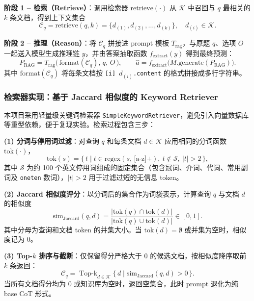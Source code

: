 \documentclass[lang=cn,a4paper,newtx]{elegantpaper}
\begin{document}
\textbf{阶段 1 -- 检索（Retrieve）}：调用检索器 $\mathrm{retrieve}(\cdot)$ 从 $\mathcal{K}$ 中召回与 $q$ 最相关的 $k$ 条文档，得到上下文集合
\begin{equation}
\mathcal{C}_q = \mathrm{retrieve}(q, k) = \{d_{(1)}, d_{(2)}, \ldots, d_{(k)}\},
\quad d_{(i)} \in \mathcal{K}.
\end{equation}

\textbf{阶段 2 -- 推理（Reason）}：将 $\mathcal{C}_q$ 拼接进 prompt 模板 $T_{\text{rag}}$，与原题 $q$、选项 $O$ 一起送入模型生成推理链 $y$，并由答案抽取函数 $f_{\text{extract}}(y)$ 得到最终预测：
\begin{equation}
P_{\text{RAG}} = T_{\text{rag}}\bigl(\,\mathrm{format}(\mathcal{C}_q),\, q,\, O\,\bigr),
\qquad
\hat{a} = f_{\text{extract}}\bigl(M.\mathrm{generate}(P_{\text{RAG}})\bigr).
\end{equation}
其中 $\mathrm{format}(\mathcal{C}_q)$ 将每条文档按 \texttt{[i] $d_{(i)}$.content} 的格式拼接成多行字符串。

\subsubsection{检索器实现：基于 Jaccard 相似度的 Keyword Retriever}

本项目采用轻量级关键词检索器 \texttt{SimpleKeywordRetriever}，避免引入向量数据库等重型依赖，便于复现实验。检索过程包含三步：

\textbf{(1) 分词与停用词过滤}：对查询 $q$ 和每条文档 $d \in \mathcal{K}$ 应用相同的分词函数 $\mathrm{tok}(\cdot)$，
\begin{equation}
\mathrm{tok}(s) = \{\, t \mid t \in \mathrm{regex}(s,\,\text{[a-z]+}),\ t \notin \mathcal{S},\ |t| > 2\,\},
\end{equation}
其中 $\mathcal{S}$ 为约 100 个英文停用词组成的固定集合（包含冠词、介词、代词、常用副词及 \texttt{one}\textendash\texttt{ten} 数词），$|t| > 2$ 用于过滤过短的无信息 token。

\textbf{(2) Jaccard 相似度评分}：以分词后的集合作为词袋表示，计算查询 $q$ 与文档 $d$ 的相似度
\begin{equation}
\mathrm{sim}_{\text{Jaccard}}(q, d)
= \frac{|\mathrm{tok}(q) \cap \mathrm{tok}(d)|}{|\mathrm{tok}(q) \cup \mathrm{tok}(d)|}
\in [0, 1].
\end{equation}
其中分母为查询和文档 token 的并集大小。当 $\mathrm{tok}(d) = \emptyset$ 或并集为空时，相似度记为 $0$。

\textbf{(3) Top-$k$ 排序与截断}：仅保留得分严格大于 $0$ 的候选文档，按相似度降序取前 $k$ 条返回：
\begin{equation}
\mathcal{C}_q = \mathop{\mathrm{Top}\text{-}k}_{d \in \mathcal{K}}\bigl\{\,d \mid \mathrm{sim}_{\text{Jaccard}}(q, d) > 0\,\bigr\}.
\end{equation}
当所有文档得分均为 $0$ 或知识库为空时，返回空集合，此时 prompt 退化为纯 base CoT 形式。
\end{document}
